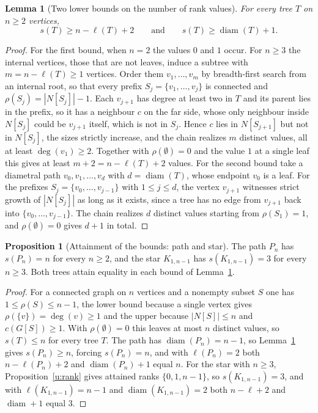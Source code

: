 \documentclass[11pt]{article}
\newtheorem{lemma}{Lemma}
\theoremstyle{definition}
\newtheorem{proposition}{Proposition}
\begin{document}
\begin{lemma}[Two lower bounds on the number of rank values]\label{u:sbounds}
For every tree $T$ on $n\ge2$ vertices,
\[
s(T)\ge n-\ell(T)+2
\qquad\text{and}\qquad
s(T)\ge\operatorname{diam}(T)+1 .
\]
\end{lemma}

\begin{proof}
For the first bound, when $n=2$ the values $0$ and $1$ occur.  For $n\ge3$ the internal vertices, those that are not leaves, induce a subtree with $m=n-\ell(T)\ge1$ vertices.  Order them $v_1,\ldots,v_m$ by breadth-first search from an internal root, so that every prefix $S_j=\{v_1,\ldots,v_j\}$ is connected and $\rho(S_j)=|N[S_j]|-1$.  Each $v_{j+1}$ has degree at least two in $T$ and its parent lies in the prefix, so it has a neighbour $c$ on the far side, whose only neighbour inside $N[S_j]$ could be $v_{j+1}$ itself, which is not in $S_j$.  Hence $c$ lies in $N[S_{j+1}]$ but not in $N[S_j]$, the sizes strictly increase, and the chain realizes $m$ distinct values, all at least $\deg(v_1)\ge2$.  Together with $\rho(\emptyset)=0$ and the value $1$ at a single leaf this gives at least $m+2=n-\ell(T)+2$ values.  For the second bound take a diametral path $v_0,v_1,\ldots,v_d$ with $d=\operatorname{diam}(T)$, whose endpoint $v_0$ is a leaf.  For the prefixes $S_j=\{v_0,\ldots,v_{j-1}\}$ with $1\le j\le d$, the vertex $v_{j+1}$ witnesses strict growth of $|N[S_j]|$ as long as it exists, since a tree has no edge from $v_{j+1}$ back into $\{v_0,\ldots,v_{j-1}\}$.  The chain realizes $d$ distinct values starting from $\rho(S_1)=1$, and $\rho(\emptyset)=0$ gives $d+1$ in total.
\end{proof}

\begin{proposition}[Attainment of the bounds: path and star]\label{u:pathstar}
The path $P_n$ has $s(P_n)=n$ for every $n\ge2$, and the star $K_{1,n-1}$ has $s(K_{1,n-1})=3$ for every $n\ge3$.  Both trees attain equality in each bound of Lemma~\ref{u:sbounds}.
\end{proposition}

\begin{proof}
For a connected graph on $n$ vertices and a nonempty subset $S$ one has $1\le\rho(S)\le n-1$, the lower bound because a single vertex gives $\rho(\{v\})=\deg(v)\ge1$ and the upper because $|N[S]|\le n$ and $c(G[S])\ge1$.  With $\rho(\emptyset)=0$ this leaves at most $n$ distinct values, so $s(T)\le n$ for every tree $T$.  The path has $\operatorname{diam}(P_n)=n-1$, so Lemma~\ref{u:sbounds} gives $s(P_n)\ge n$, forcing $s(P_n)=n$, and with $\ell(P_n)=2$ both $n-\ell(P_n)+2$ and $\operatorname{diam}(P_n)+1$ equal $n$.  For the star with $n\ge3$, Proposition~\ref{u:rank} gives attained ranks $\{0,1,n-1\}$, so $s(K_{1,n-1})=3$, and with $\ell(K_{1,n-1})=n-1$ and $\operatorname{diam}(K_{1,n-1})=2$ both $n-\ell+2$ and $\operatorname{diam}+1$ equal $3$.
\end{proof}
\end{document}
